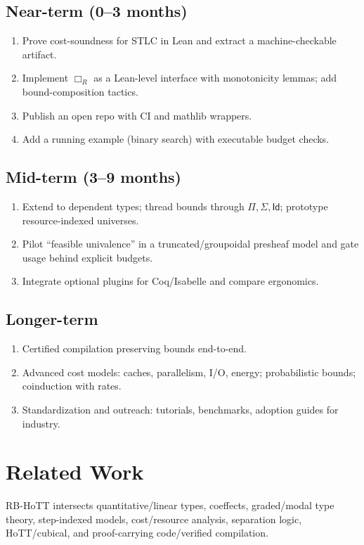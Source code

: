 \documentclass[11pt]{article}
\newcommand{\Id}{\mathsf{Id}}
\newcommand{\modal}[1]{\Box_{#1}}
\begin{document}
\subsection{Near-term (0--3 months)}
\begin{enumerate}[leftmargin=2em]
  \item Prove cost-soundness for STLC in Lean and extract a machine-checkable artifact.
  \item Implement $\modal{R}$ as a Lean-level interface with monotonicity lemmas; add bound-composition tactics.
  \item Publish an open repo with CI and mathlib wrappers.
  \item Add a running example (binary search) with executable budget checks.
\end{enumerate}
\subsection{Mid-term (3--9 months)}
\begin{enumerate}[leftmargin=2em]
  \item Extend to dependent types; thread bounds through $\Pi,\Sigma,\Id$; prototype resource-indexed universes.
  \item Pilot ``feasible univalence'' in a truncated/groupoidal presheaf model and gate usage behind explicit budgets.
  \item Integrate optional plugins for Coq/Isabelle and compare ergonomics.
\end{enumerate}
\subsection{Longer-term}
\begin{enumerate}[leftmargin=2em]
  \item Certified compilation preserving bounds end-to-end.
  \item Advanced cost models: caches, parallelism, I/O, energy; probabilistic bounds; coinduction with rates.
  \item Standardization and outreach: tutorials, benchmarks, adoption guides for industry.
\end{enumerate}

\section{Related Work}
RB-HoTT intersects quantitative/linear types, coeffects, graded/modal type theory, step-indexed models, cost/resource analysis, separation logic, HoTT/cubical, and proof-carrying code/verified compilation.
\end{document}
